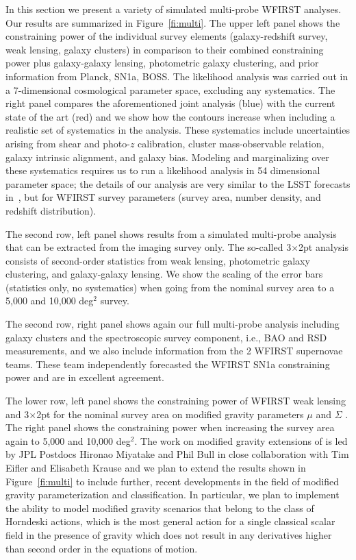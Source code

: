 In this section we present a variety of simulated multi-probe WFIRST analyses.
Our results are summarized in Figure~\ref{fi:multi}. The upper left panel shows
the constraining power of the individual survey elements (galaxy-redshift
survey, weak lensing, galaxy clusters) in comparison to their combined
constraining power plus galaxy-galaxy lensing, photometric galaxy clustering,
and prior information from Planck, SN1a, BOSS\@. The likelihood analysis was
carried out in a 7-dimensional cosmological parameter space, excluding any
systematics. The right panel compares the aforementioned joint analysis (blue)
with the current state of the art (red) and we show how the contours increase
when including a realistic set of systematics in the analysis. These systematics
include uncertainties arising from shear and photo-$z$ calibration, cluster
mass-observable relation, galaxy intrinsic alignment, and galaxy bias. Modeling
and marginalizing over these systematics requires us to run a likelihood
analysis in 54 dimensional parameter space; the details of our analysis are very
similar to the LSST forecasts in~\citet{Krause2017}, but for WFIRST survey
parameters (survey area, number density, and redshift distribution).

The second row, left panel shows results from a simulated multi-probe analysis
that can be extracted from the imaging survey only. The so-called 3$\times$2pt analysis
consists of second-order statistics from weak lensing, photometric galaxy
clustering, and galaxy-galaxy lensing. We show the scaling of the error bars
(statistics only, no systematics) when going from the nominal survey area to a
5,000 and 10,000 deg$^2$ survey.

The second row, right panel shows again our full multi-probe analysis including
galaxy clusters and the spectroscopic survey component, i.e., BAO and RSD
measurements, and we also include information from the 2 WFIRST supernovae
teams. These team independently forecasted the WFIRST SN1a constraining power
and are in excellent agreement.

The lower row, left panel shows the constraining power of WFIRST weak lensing
and 3$\times$2pt for the nominal survey area on modified gravity parameters $\mu$ and
$\Sigma$ \citep[see e.g.,][for details]{jjk15, baa15}. The right panel shows the
constraining power when increasing the survey area again to 5,000 and 10,000
deg$^2$. The work on modified gravity extensions of \CoLi is led by JPL Postdocs Hironao Miyatake and Phil Bull in close collaboration with Tim Eifler and Elisabeth Krause and we plan to extend the results shown in Figure~\ref{fi:multi} to include further, recent developments in the field of modified gravity parameterization and classification. In particular, we plan to implement the ability to model modified gravity scenarios that belong to the class of Horndeski actions, which is the most general action for a single classical scalar field in the presence of gravity which does not result in any derivatives higher than second order in the equations of motion.

